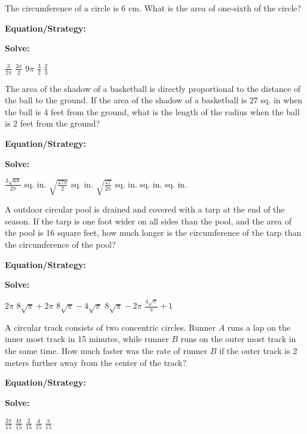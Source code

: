 \vfill
\newpage
\begin{multicols*}{2}
\begin{outline}[enumerate]
\medium

\1 The circumference of a circle is 6 cm. What is the area of one-sixth of the circle?

\bigskip
\textbf{Equation/Strategy:} \hrulefill

\bigskip
\textbf{Solve:}

\vfill
\2 $\frac{3}{2\pi}$
\2 $\frac{3\pi}{2}$
\2 $9\pi$
\2 $\frac{3}{2}$
\2 $\frac{2}{3}$

\midline

\1 The area of the shadow of a basketball is directly proportional to the distance of the ball to the ground. If the area of the shadow of a basketball is 27 sq. in when the ball is 4 feet from the ground, what is the length of the radius when the ball is 2 feet from the ground?

\bigskip
\textbf{Equation/Strategy:} \hrulefill

\bigskip
\textbf{Solve:}

\vfill
\2 $\frac{3\sqrt{6\pi}}{2\pi}$ sq. in.
\2 $\sqrt{\frac{27\pi}{2}}$ sq. in.
\2 $\sqrt{\frac{27}{2\pi}}$ sq. in.
 sq. in.
 sq. in.

\columnbreak
\advanced

\1 A outdoor circular pool is drained and covered with a tarp at the end of the season. If the tarp is one foot wider on all sides than the pool, and the area of the pool is 16 square feet, how much longer is the circumference of the tarp than the circumference of the pool?

\bigskip
\textbf{Equation/Strategy:} \hrulefill

\bigskip
\textbf{Solve:}

\vfill
\2 $2\pi$
\2 $8\sqrt\pi+2\pi$
\2 $8\sqrt\pi-4\sqrt\pi$
\2 $8\sqrt\pi-2\pi$
\2 $\frac{4\sqrt\pi}{\pi}+1$

\midline

\1 A circular track consists of two concentric circles. Runner $A$ runs a lap on the inner most track in 15 minutes, while runner $B$ runs on the outer most track in the same time. How much faster was the rate of runner $B$ if the outer track is 2 meters further away from the center of the track?

\bigskip
\textbf{Equation/Strategy:}

\bigskip
\textbf{Solve:}

\vfill
\2 $\frac{2\pi}{15}$
\2 $\frac{4\pi}{15}$
\2 $\frac{2}{15}$
\2 $\frac{4}{15}$
\2 $\frac{\pi}{15}$
\end{outline}
\end{multicols*}